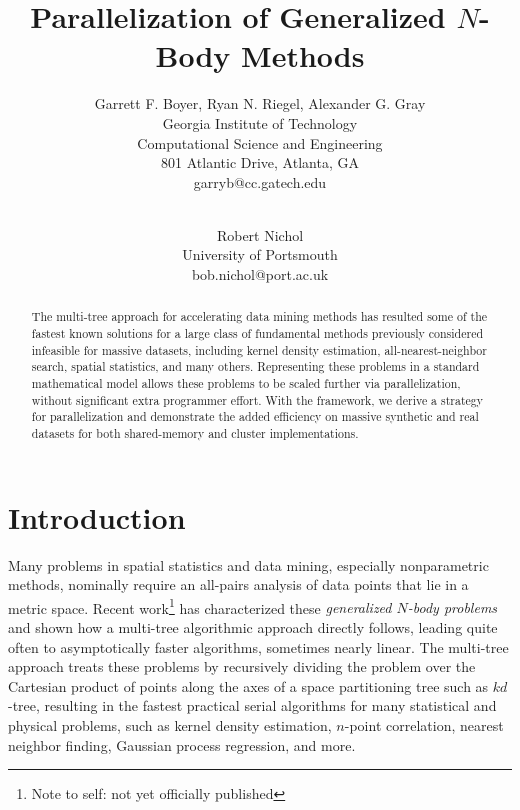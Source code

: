 \documentclass[times, leqno,twocolumn]{article}
\newcommand{\authornote}[1]{\footnote{Note to self: #1}}
\newcommand{\authorsnote}[1]{\authornote{#1}}
\begin{document}
\title{Parallelization of Generalized $N$-Body Methods}

\author{Garrett F. Boyer, Ryan N. Riegel, Alexander G. Gray
\\ Georgia Institute of Technology
\\ Computational Science and Engineering
\\ 801 Atlantic Drive, Atlanta, GA
\\ garryb@cc.gatech.edu
\\
\and
\\ Robert Nichol
\\ University of Portsmouth
\\ bob.nichol@port.ac.uk
}

\maketitle
\thispagestyle{empty}

\begin{abstract}
The multi-tree approach for accelerating data mining methods has resulted some of the fastest known solutions for a large class of fundamental methods previously considered infeasible for massive datasets, including kernel density estimation, all-nearest-neighbor search, spatial statistics, and many others.
Representing these problems in a standard mathematical model allows these problems to be scaled further via parallelization, without significant extra programmer effort.
With the framework, we derive a strategy for parallelization and demonstrate the added efficiency on massive synthetic and real datasets for both shared-memory and cluster implementations.
\end{abstract}

\section{Introduction}

Many problems in spatial statistics and data mining, especially nonparametric methods, nominally require an all-pairs analysis of data points that lie in a metric space.
Recent work\authorsnote{not yet officially published}\cite{ryan_nips} has characterized these {\it generalized $N$-body problems} and shown how a multi-tree algorithmic approach directly follows, leading quite often to asymptotically faster algorithms, sometimes nearly linear.
The multi-tree approach treats these problems by recursively dividing the problem over the Cartesian product of points along the axes of a space partitioning tree such as $kd$-tree, resulting in the fastest practical serial algorithms for many statistical and physical problems, such as kernel density estimation, $n$-point correlation, nearest neighbor finding, Gaussian process regression, and more.
\end{document}
